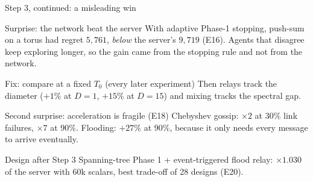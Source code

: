 \documentclass[11pt]{beamer}
\begin{document}
\begin{frame}{Step 3, continued: a misleading win}
\footnotesize
\begin{block}{Surprise: the network beat the server}
With adaptive Phase-1 stopping, push-sum on a torus had regret $5{,}761$, \emph{below} the server's $9{,}719$ (E16). Agents that disagree keep exploring longer, so the gain came from the stopping rule and not from the network.
\end{block}
\begin{block}{Fix: compare at a fixed $T_0$ (every later experiment)}
Then relays track the diameter ($+1\%$ at $D{=}1$, $+15\%$ at $D{=}15$) and mixing tracks the spectral gap.
\end{block}
\begin{block}{Second surprise: acceleration is fragile (E18)}
Chebyshev gossip: $\times2$ at $30\%$ link failures, $\times7$ at $90\%$. Flooding: $+27\%$ at $90\%$, because it only needs every message to arrive eventually.
\end{block}
\begin{alertblock}{Design after Step 3}
Spanning-tree Phase 1 + event-triggered flood relay: $\times1.030$ of the server with $60$k scalars, best trade-off of 28 designs (E20).
\end{alertblock}
\end{frame}
\end{document}
